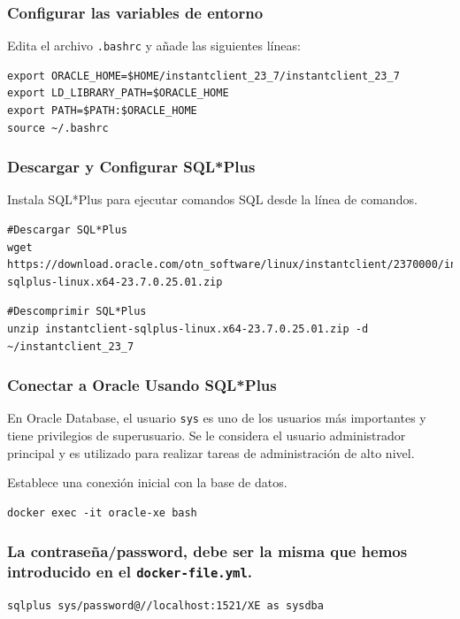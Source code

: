 \documentclass{article}
\begin{document}
\subsubsection{Configurar las variables de entorno}

Edita el archivo \texttt{.bashrc} y añade las siguientes líneas:

\begin{lstlisting}[style=bashStyle]
export ORACLE_HOME=$HOME/instantclient_23_7/instantclient_23_7
export LD_LIBRARY_PATH=$ORACLE_HOME
export PATH=$PATH:$ORACLE_HOME
source ~/.bashrc
\end{lstlisting}

\subsubsection{Descargar y Configurar SQL*Plus}
Instala SQL*Plus para ejecutar comandos SQL desde la línea de comandos.

\begin{lstlisting}[style=bashStyle]
#Descargar SQL*Plus
wget https://download.oracle.com/otn_software/linux/instantclient/2370000/instantclient-sqlplus-linux.x64-23.7.0.25.01.zip
\end{lstlisting}

\begin{lstlisting}[style=bashStyle]
#Descomprimir SQL*Plus
unzip instantclient-sqlplus-linux.x64-23.7.0.25.01.zip -d ~/instantclient_23_7
\end{lstlisting}

\subsubsection{Conectar a Oracle Usando SQL*Plus}
En Oracle Database, el usuario \texttt{sys} es uno de los usuarios más importantes y tiene privilegios de superusuario. Se le considera el usuario administrador principal y es utilizado para realizar tareas de administración de alto nivel. 

Establece una conexión inicial con la base de datos.
\begin{lstlisting}
docker exec -it oracle-xe bash
\end{lstlisting}

\subsubsection{La contraseña/password, debe ser la misma que hemos introducido en el \texttt{docker-file.yml}.}
\begin{lstlisting}[style=bashStyle]
sqlplus sys/password@//localhost:1521/XE as sysdba
\end{lstlisting}
\end{document}

